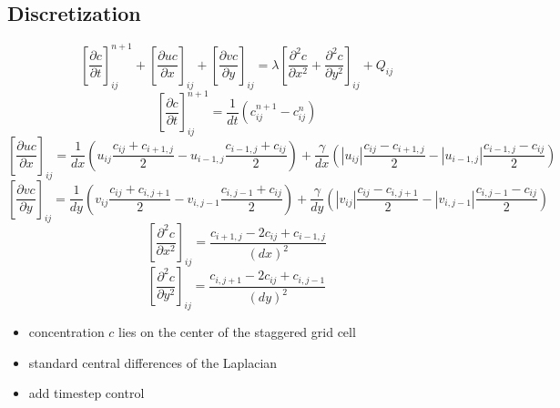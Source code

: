 \documentclass{article}
\begin{document}
\subsection{Discretization}
\begin{equation}
\left \lbrack \frac{\partial c}{\partial t} \right \rbrack_{ij}^{n+1} + \left
\lbrack \frac{\partial uc}{\partial x} \right \rbrack_{ij} + \left \lbrack
\frac{\partial vc}{\partial y} \right \rbrack_{ij} = \lambda \left \lbrack
\frac{\partial^2 c}{\partial x^2} + \frac{\partial^2 c}{\partial y^2} \right \rbrack_{ij} + Q_{ij}
\end{equation}
\begin{equation}
\left \lbrack \frac{\partial c}{\partial t} \right \rbrack_{ij}^{n+1} =
\frac{1}{dt} \left (c_{ij}^{n+1} - c_{ij}^n \right )
\end{equation}
\begin{equation}
\left \lbrack \frac{\partial uc}{\partial x} \right \rbrack_{ij} =
\frac{1}{dx} \left (u_{ij} \frac{c_{ij}+c_{i+1,j}}{2} - u_{i-1,j}
\frac{c_{i-1,j}+c_{ij}}{2} \right) +
\frac{\gamma}{dx} \left (|u_{ij}| \frac{c_{ij}-c_{i+1,j}}{2} - |u_{i-1,j}|
\frac{c_{i-1,j}-c_{ij}}{2} \right)
\end{equation}
\begin{equation}
\left \lbrack \frac{\partial vc}{\partial y} \right \rbrack_{ij} =
\frac{1}{dy} \left (v_{ij} \frac{c_{ij}+c_{i,j+1}}{2} - v_{i,j-1}
\frac{c_{i,j-1}+c_{ij}}{2} \right) +
\frac{\gamma}{dy} \left (|v_{ij}| \frac{c_{ij}-c_{i,j+1}}{2} - |v_{i,j-1}|
\frac{c_{i,j-1}-c_{ij}}{2} \right)
\end{equation}
\begin{equation}
\left \lbrack \frac{\partial^2 c}{\partial x^2} \right \rbrack_{ij} =
\frac{c_{i+1,j} -2 c_{ij} + c_{i-1,j}}{(dx)^2}
\end{equation}
\begin{equation}
\left \lbrack \frac{\partial^2 c}{\partial y^2} \right \rbrack_{ij} =
\frac{c_{i,j+1} -2 c_{ij} + c_{i,j-1}}{(dy)^2}
\end{equation}

\begin{itemize}
	\item concentration $c$ lies on the center of the staggered grid cell
	\item standard central differences of the Laplacian
	\item add timestep control
\end{itemize}
\end{document}
